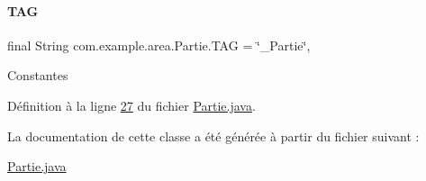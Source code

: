 \paragraph{\texorpdfstring{T\+AG}{TAG}}
{\footnotesize\ttfamily final String com.\+example.\+area.\+Partie.\+T\+AG = \char`\"{}\+\_\+\+Partie\char`\"{}\hspace{0.3cm}{\ttfamily [static]}, {\ttfamily [private]}}

Constantes 

Définition à la ligne \hyperlink{_partie_8java_source_l00027}{27} du fichier \hyperlink{_partie_8java_source}{Partie.\+java}.



La documentation de cette classe a été générée à partir du fichier suivant \+:\begin{DoxyCompactItemize}
\item 
\hyperlink{_partie_8java}{Partie.\+java}\end{DoxyCompactItemize}
